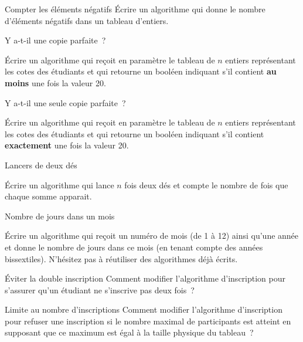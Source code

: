 	\begin{Exercice}{Compter les éléments négatifs}
		Écrire un algorithme qui
		donne le nombre d’éléments négatifs dans un tableau d’entiers.
	\end{Exercice}


	\begin{Exercice}{Y a-t-il une copie parfaite~?}

		Écrire un algorithme qui reçoit en paramètre le tableau
		 de $n$ entiers représentant les cotes des étudiants 
		et qui retourne un booléen 
		indiquant s’il contient \textbf{au moins} une fois la valeur 20. 
	\end{Exercice}

	\begin{Exercice}{Y a-t-il une seule copie parfaite~?}

		Écrire un algorithme qui reçoit en paramètre le tableau
		 de $n$ entiers représentant les cotes des étudiants 
		et qui retourne un booléen 
		indiquant s’il contient \textbf{exactement} une fois la valeur 20. 
	\end{Exercice}

	\begin{Exercice}{Lancers de deux dés}

		Écrire un algorithme qui lance $n$ fois deux dés
		et compte le nombre de fois que chaque somme apparait.
		\begin{pseudocode}
		\end{pseudocode}
	\end{Exercice}

	\begin{Exercice}{Nombre de jours dans un mois}

		Écrire un algorithme qui reçoit un numéro de mois (de 1 à 12)
		ainsi qu’une année et donne le nombre de jours dans ce mois
		(en tenant compte des années bissextiles).
		N’hésitez pas à réutiliser des algorithmes déjà écrits.
	\end{Exercice}




	\begin{Exercice}{Éviter la double inscription}
		Comment modifier l’algorithme d’inscription
		pour s’assurer qu’un étudiant ne s’inscrive pas deux fois~?
	\end{Exercice}

	\begin{Exercice}{Limite au nombre d’inscriptions}
		Comment modifier l’algorithme d’inscription
		pour refuser une inscription si le nombre maximal
		de participants est atteint
		en supposant que ce maximum est égal à la taille physique du tableau~?
	\end{Exercice}

